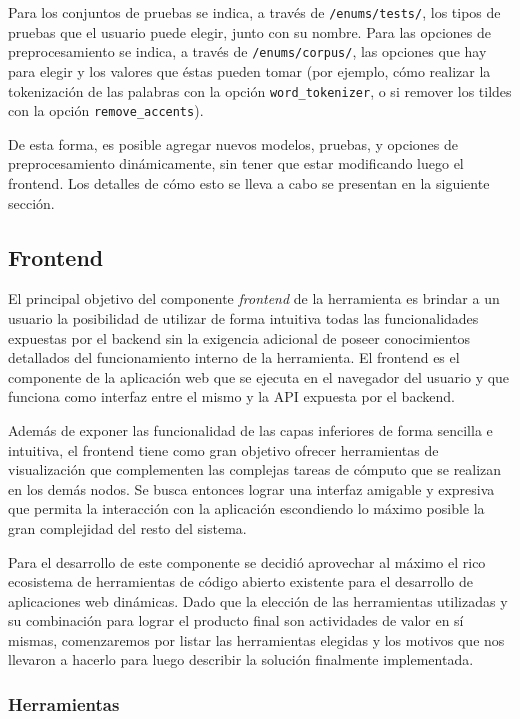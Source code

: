Para los conjuntos de pruebas se indica, a través de \texttt{/enums/tests/}, los tipos de pruebas
que el usuario puede elegir, junto con su nombre. Para las opciones de preprocesamiento se indica, a
través de \texttt{/enums/corpus/}, las opciones que hay para elegir y los valores que éstas pueden
tomar (por ejemplo, cómo realizar la tokenización de las palabras con la opción
\texttt{word\_tokenizer}, o si remover los tildes con la opción \texttt{remove\_accents}).


De esta forma, es posible agregar nuevos modelos, pruebas, y opciones de preprocesamiento
dinámicamente, sin tener que estar modificando luego el frontend. Los detalles de cómo esto se lleva
a cabo se presentan en la siguiente sección.


\subsection{Frontend}

El principal objetivo del componente \textit{frontend} de la herramienta es brindar a un usuario la
posibilidad de utilizar de forma intuitiva todas las funcionalidades expuestas por el backend sin la
exigencia adicional de poseer conocimientos detallados del funcionamiento interno de la herramienta.
El frontend es el componente de la aplicación web que se ejecuta en el navegador del usuario y que
funciona como interfaz entre el mismo y la API expuesta por el backend.

Además de exponer las funcionalidad de las capas inferiores de forma sencilla e intuitiva, el frontend
tiene como gran objetivo ofrecer herramientas de visualización que complementen las complejas tareas de
cómputo que se realizan en los demás nodos. Se busca entonces lograr una interfaz amigable y expresiva
que permita la interacción con la aplicación escondiendo lo máximo posible la gran complejidad del resto
del sistema.

Para el desarrollo de este componente se decidió aprovechar al máximo el rico ecosistema de herramientas
de código abierto existente para el desarrollo de aplicaciones web dinámicas. Dado que la elección de las
herramientas utilizadas y su combinación para lograr el producto final son actividades de valor en sí
mismas, comenzaremos por listar las herramientas elegidas y los motivos que nos llevaron a hacerlo para
luego describir la solución finalmente implementada.

\subsubsection{Herramientas}

